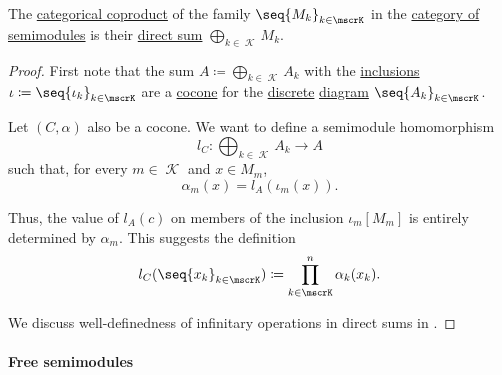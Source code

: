 \begin{proposition}\label{thm:semimodule_coproduct}
  The \hyperref[def:discrete_category_limits]{categorical coproduct} of the family \( \seq{ M_k }_{k \in \mscrK} \) in the \hyperref[def:semimodule/category]{category of  semimodules} is their \hyperref[def:semimodule_direct_sum]{direct sum} \( \bigoplus_{k \in \mscrK} M_k \).
\end{proposition}
\begin{proof}
  First note that the sum \( A \coloneqq \bigoplus_{k \in \mscrK} A_k \) with the \hyperref[def:semimodule_direct_sum/inclusion]{inclusions} \( \iota \coloneqq \seq{ \iota_k }_{k \in \mscrK} \) are a \hyperref[def:category_of_cones/cocone]{cocone} for the \hyperref[def:discrete_category]{discrete} \hyperref[def:categorical_diagram]{diagram} \( \seq{ A_k }_{k \in \mscrK} \).

  Let \( (C, \alpha) \) also be a cocone. We want to define a semimodule homomorphism
  \begin{equation*}
    l_C: \bigoplus_{k \in \mscrK} A_k \to A
  \end{equation*}
  such that, for every \( m \in \mscrK \) and \( x \in M_m \),
  \begin{equation*}
    \alpha_m(x) = l_A(\iota_m(x)).
  \end{equation*}

  Thus, the value of \( l_A(c) \) on members of the inclusion \( \iota_m[M_m] \) is entirely determined by \( \alpha_m \). This suggests the definition
  \begin{equation*}
    l_C(\seq{ x_k }_{k \in \mscrK}) \coloneqq \prod_{k \in \mscrK}^n \alpha_k(x_k).
  \end{equation*}

  We discuss well-definedness of infinitary operations in direct sums in .
\end{proof}

\paragraph{Free semimodules}

